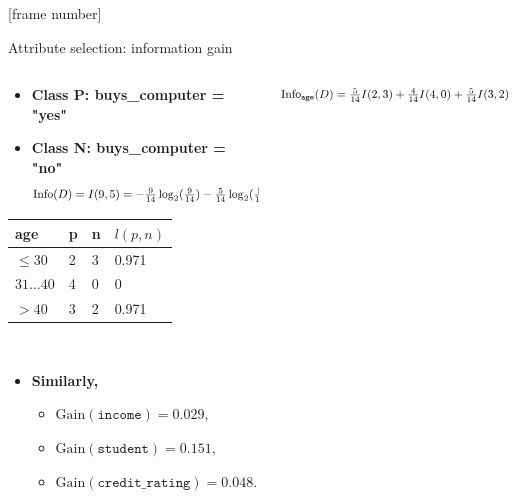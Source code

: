 \documentclass[aspectratio=169,t,table]{beamer}
\begin{document}
  {
    [frame number]
    \begin{frame}{Attribute selection: information gain}
      \begin{columns}
        \begin{column}{0.45\textwidth}
          \begin{itemize}
            \item \textbf{Class P: buys\_computer = "yes"}
            \item \textbf{Class N: buys\_computer = "no"}
            \begin{align*}
              \resizebox{7cm}{!}{%
                $\text{Info}(D) = I(9,5) = - \frac{9}{14}\log_2(\frac{9}{14})-\frac{5}{14} \log_2(\frac{5}{14}) = 0.94$
              }
            \end{align*}
          \end{itemize}
          \centering
          \begin{tabular}{|l|l|l|l|}
            \hline
            \cellcolor{blue!20}age & \cellcolor{blue!20}p & \cellcolor{blue!20}n & \cellcolor{blue!20}$l(p,n)$ \\\hline
            \cellcolor{yellow!20}$\leq 30$ & 2 & 3 & 0.971 \\\hline
            \cellcolor{yellow!20}$31\ldots40$ & 4 & 0 & 0 \\\hline
            \cellcolor{yellow!20}$>40$ & 3 & 2 & 0.971 \\\hline
          \end{tabular}\\[0.2cm]
        \begin{itemize}
          \item \textbf{Similarly,}
          \begin{itemize}
            \item $\text{Gain}(\texttt{income}) = 0.029$,
            \item $\text{Gain}(\texttt{student}) = 0.151$,
            \item $\text{Gain}(\texttt{credit\_rating}) = 0.048$.
          \end{itemize}
        \end{itemize}
        \end{column}
        \begin{column}{0.45\textwidth}
          \vspace{-1.3cm}
          \begin{align*}
            \resizebox{7cm}{!}{%
              $\text{Info}_{\texttt{age}}(D) = \frac{5}{14}I(2,3) + \frac{4}{14} I(4,0) + \frac{5}{14} I(3,2) = 0.694$.
}
\end{align*}
\end{column}
\end{columns}
\end{frame}}
\end{document}
